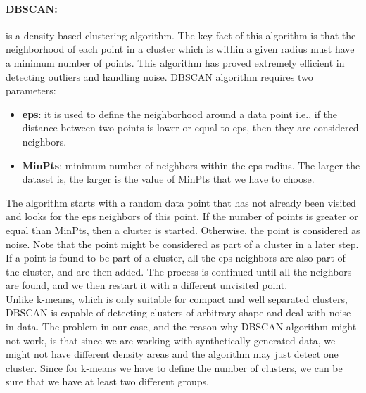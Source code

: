 \documentclass[sigconf]{acmart}
\begin{document}
\paragraph{DBSCAN:} is a density-based clustering algorithm. The key fact of this algorithm is that the neighborhood of each point in a cluster which is within a given radius must have a minimum number of points. This algorithm has proved extremely efficient in detecting outliers and handling noise. DBSCAN algorithm requires two parameters: 
\begin{itemize}
    \item \textbf{eps}: it is used to define the neighborhood around a data point i.e., if the distance between two points is lower or equal to eps, then they are considered neighbors.
    \item \textbf{MinPts}: minimum number of neighbors within the eps radius. The larger the dataset is, the larger is the value of MinPts that we have to choose.
\end{itemize}
The algorithm starts with a random data point that has not already been visited and looks for the eps neighbors of this point. If the number of points is greater or equal than MinPts, then a cluster is started. Otherwise, the point is considered as noise. Note that the point might be considered as part of a cluster in a later step. If a point is found to be part of a cluster, all the eps neighbors are also part of the cluster, and are then added. The process is continued until all the neighbors are found, and we then restart it with a different unvisited point.\\

Unlike k-means, which is only suitable for compact and well separated clusters, DBSCAN is capable of detecting clusters of arbitrary shape and deal with noise in data. The problem in our case, and the reason why DBSCAN algorithm might not work, is that since we are working with synthetically generated data, we might not have different density areas and the algorithm may just detect one cluster. Since for k-means we have to define the number of clusters, we can be sure that we have at least two different groups.
\end{document}
